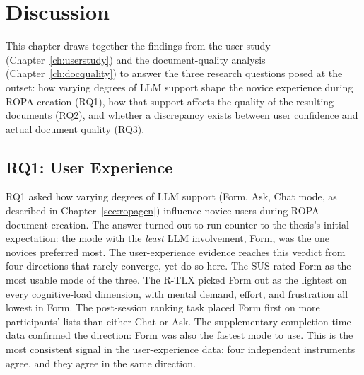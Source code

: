\chapter{Discussion}
\label{ch:discussion}

This chapter draws together the findings from the user study
(Chapter~\ref{ch:userstudy}) and the document-quality analysis
(Chapter~\ref{ch:docquality}) to answer the three research
questions posed at the outset: how varying degrees of LLM
support shape the novice experience during ROPA creation
(RQ1), how that support affects the quality of the resulting
documents (RQ2), and whether a discrepancy exists between user
confidence and actual document quality (RQ3).


\section{RQ1: User Experience}
\label{sec:disc-rq1}

RQ1 asked how varying degrees of LLM support (Form, Ask, Chat mode,
as described in Chapter~\ref{sec:ropagen}) influence novice
users during ROPA document creation. The answer turned out to
run counter to the thesis's initial expectation: the mode with
the \emph{least} LLM involvement, Form, was the one novices
preferred most. The user-experience evidence reaches this verdict
from four directions that rarely converge, yet do so here.
The SUS rated Form as the most usable mode
of the three. The R-TLX picked Form out as the lightest on every
cognitive-load dimension, with mental demand, effort, and
frustration all lowest in Form. The post-session ranking task
placed Form first on more participants' lists than either Chat
or Ask. The supplementary completion-time data confirmed the
direction: Form was also the fastest mode to use.
This is the most consistent signal in the user-experience data:
four independent instruments agree, and they agree in the same direction.

